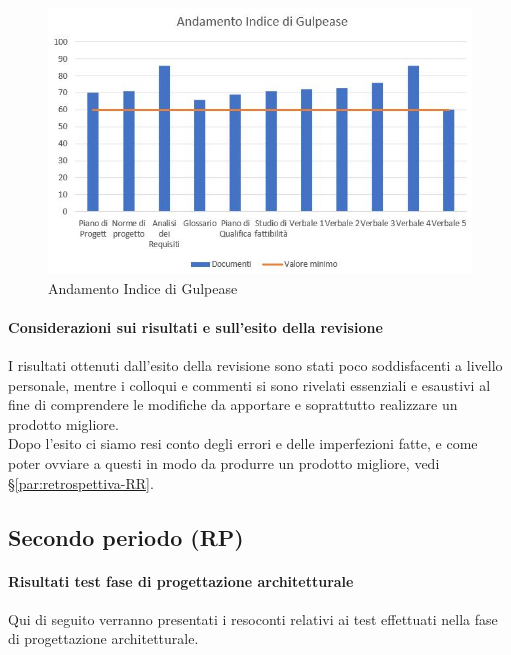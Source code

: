 \documentclass[../piano_di_qualifica.tex]{subfiles}
\begin{document}
\begin{figure}[H]
	\centering
	\includegraphics[width=12cm]{img/media_gul.jpg}
	\caption{ Andamento Indice di Gulpease}
\end{figure}

\paragraph{Considerazioni sui risultati e sull’esito della revisione }
I risultati ottenuti dall’esito della revisione sono stati poco soddisfacenti a livello personale, 
mentre i colloqui e commenti si sono rivelati essenziali e esaustivi al fine di comprendere le modifiche da apportare
e soprattutto realizzare un prodotto migliore. \\
Dopo l'esito ci siamo resi conto degli errori e delle imperfezioni fatte, 
e come poter ovviare a questi in modo da produrre un prodotto migliore, vedi \S\ref{par:retrospettiva-RR}. \\


\subsection{Secondo periodo (RP)}
\label{sub:periodo-RP}
\paragraph{Risultati test fase di progettazione architetturale}
Qui di seguito verranno presentati i resoconti relativi ai test effettuati nella fase di progettazione architetturale. \par
\end{document}
